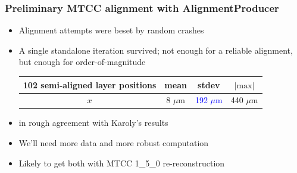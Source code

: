 \documentclass[compress]{beamer}
\begin{document}
\begin{frame}
\frametitle{Preliminary MTCC alignment with AlignmentProducer}
\begin{itemize}\setlength{\itemsep}{0.25 cm}
\item Alignment attempts were beset by random crashes
\item A single standalone iteration survived; not enough for a reliable alignment, but enough for order-of-magnitude

\vspace{0.25 cm}
\begin{center}
\begin{tabular}{c | c c c}
102 semi-aligned layer positions & mean & stdev & $|\mbox{max}|$ \\ \hline
$x$ & 8 $\mu$m & \textcolor{blue}{192 $\mu$m} & 440 $\mu$m
\end{tabular}
\end{center}

\vspace{0.25 cm}
\item in rough agreement with Karoly's results

\vfill
\item We'll need more data and more robust computation
\item Likely to get both with MTCC 1\_5\_0 re-reconstruction
\end{itemize}
\end{frame}
\end{document}
